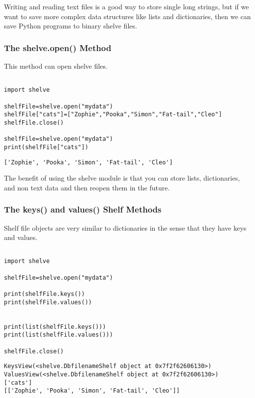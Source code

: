 \documentclass[11pt]{article}
\begin{document}
Writing and reading text files is a good way to store single long strings, but if we want to save more complex data structures like lists and dictionaries, then we can save Python programs to binary shelve files.

\subsubsection{The shelve.open() Method}
\label{sec:org57474f7}

This method can open shelve files.

\begin{verbatim}

import shelve

shelfFile=shelve.open("mydata")
shelfFile["cats"]=["Zophie","Pooka","Simon","Fat-tail","Cleo"]
shelfFile.close()

shelfFile=shelve.open("mydata")
print(shelfFile["cats"])

\end{verbatim}

\begin{verbatim}
['Zophie', 'Pooka', 'Simon', 'Fat-tail', 'Cleo']
\end{verbatim}


The benefit of using the shelve module is that you can store lists, dictionaries, and non text data and then reopen them in the future.

\subsubsection{The keys() and values() Shelf Methods}
\label{sec:orga1d9307}

Shelf file objects are very similar to dictionaries in the sense that they have keys and values.

\begin{verbatim}

import shelve

shelfFile=shelve.open("mydata")

print(shelfFile.keys())
print(shelfFile.values())


print(list(shelfFile.keys()))
print(list(shelfFile.values()))

shelfFile.close()
\end{verbatim}

\begin{verbatim}
KeysView(<shelve.DbfilenameShelf object at 0x7f2f62606130>)
ValuesView(<shelve.DbfilenameShelf object at 0x7f2f62606130>)
['cats']
[['Zophie', 'Pooka', 'Simon', 'Fat-tail', 'Cleo']]
\end{verbatim}
\end{document}
